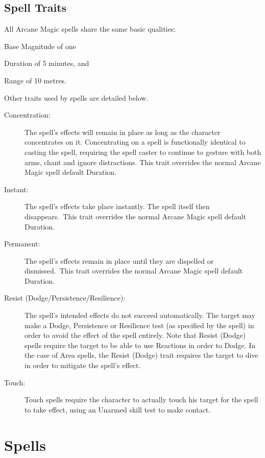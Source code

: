 \subsection{Spell Traits}
All Arcane Magic spells share the same basic qualities:

\begin{rpg-list}
\item Base Magnitude of one 
\item Duration of 5 minutes, and
\item Range of 10 metres.
\end{rpg-list}

Other traits used by spells are detailed below. 
\begin{description}
	\item[Concentration:] The spell’s effects will remain in place as long as the character concentrates on it. Concentrating on a spell is functionally identical to casting the spell, requiring the spell caster to continue to gesture with both arms, chant and ignore distractions. This trait overrides the normal Arcane Magic spell default Duration. 
	\item[Instant:] The spell’s effects take place instantly. The spell itself then disappears. This trait overrides the normal Arcane Magic spell default Duration. 
	\item[Permanent:] The spell’s effects remain in place until they are dispelled or dismissed. This trait overrides the normal Arcane Magic spell default Duration.
	\item[Resist (Dodge/Persistence/Resilience):] The spell’s intended effects do not succeed automatically. The target may make a Dodge, Persistence or Resilience test (as specified by the spell) in order to avoid the effect of the spell entirely. Note that Resist (Dodge) spells require the target to be able to use Reactions in order to Dodge. In the case of Area spells, the Resist (Dodge) trait requires the target to dive in order to mitigate the spell’s effect. 
	\item[Touch:] Touch spells require the character to actually touch his target for the spell to take effect, using an Unarmed skill test to make contact.%
\end{description}

\section{Spells}

